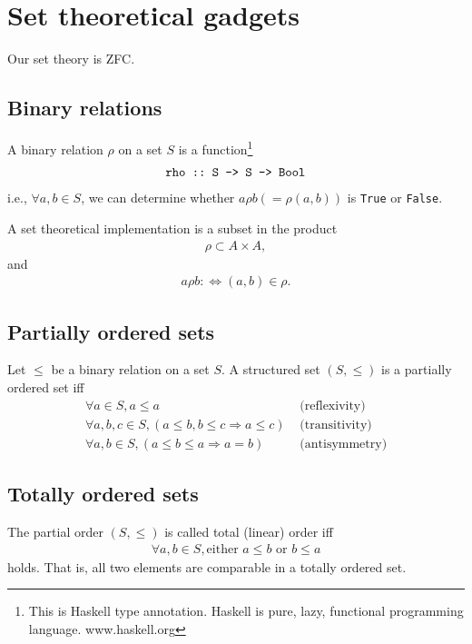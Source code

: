 \documentclass[11pt]{book}
\begin{document}
\section{Set theoretical gadgets}
Our set theory is ZFC.


\subsection{Binary relations}
A binary relation $\rho$ on a set $S$ is a function\footnote{This is Haskell type annotation. Haskell is pure, lazy, functional programming language. www.haskell.org}
\begin{eqnarray}
\verb|rho :: S -> S -> Bool|
\end{eqnarray}
i.e., $\forall a,b \in S$, we can determine whether $a \rho b \left( = \rho(a,b) \right)$ is \verb|True| or \verb|False|.

A set theoretical implementation is a subset in the product
\begin{eqnarray}
\rho \subset A \times A,
\end{eqnarray}
and
\begin{eqnarray}
a \rho b :\Leftrightarrow (a,b) \in \rho.
\end{eqnarray}

\subsection{Partially ordered sets}
Let $\leq$ be a binary relation on a set $S$.
A structured set $(S, \leq)$ is a partially ordered set iff
\begin{eqnarray}
\forall a \in S, a \leq a & \text{ (reflexivity)} \\
\forall a,b,c \in S, (a \leq b, b \leq c \Rightarrow a \leq c) & \text{ (transitivity)} \\
\forall a,b \in S, (a \leq b \leq a \Rightarrow a = b) & \text{ (antisymmetry)}
\end{eqnarray}

\subsection{Totally ordered sets}
The partial order $(S, \leq)$ is called total (linear) order iff
\begin{eqnarray}
\forall a,b \in S, \text{either } a \leq b \text{ or } b \leq a
\end{eqnarray}
holds.
That is, all two elements are comparable in a totally ordered set.
\end{document}
